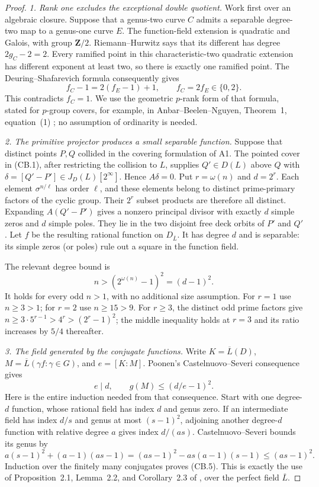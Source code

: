 \begin{proof}
\emph{1. Rank one excludes the exceptional double quotient.}
Work first over an algebraic closure. Suppose that a genus-two curve
$C$ admits a separable degree-two map to a genus-one curve $E$.
The function-field extension is quadratic and Galois, with group
$\mathbf Z/2$. Riemann--Hurwitz says that its different has degree
$2g_C-2=2$. Every ramified point in this characteristic-two quadratic
extension has different exponent at least two, so there is exactly
one ramified point. The Deuring--Shafarevich formula consequently gives
\[
 f_C-1=2(f_E-1)+1,\qquad f_C=2f_E\in\{0,2\}.              \tag{CB.3}
\]
This contradicts $f_C=1$. We use the geometric $p$-rank form of that
formula, stated for $p$-group covers, for example, in
Anbar--Beelen--Nguyen, Theorem~1, equation~(1)
\cite{AnbarBeelenNguyenP}; no assumption of ordinarity is needed.

\emph{2. The primitive projector produces a small separable function.}
Suppose that distinct points $P,Q$ collided in the covering formulation
of A1. The pointed cover in (CB.1), after restricting the collision
to $L$, supplies $Q'\in D(L)$ above $Q$ with
$\delta=[Q'-P']\in J_D(L)[2^\infty]$. Hence $A\delta=0$.
Put $r=\omega(n)$ and $d=2^r$. Each element
$\sigma^{n/\ell}$ has order $\ell$, and these elements belong to
distinct prime-primary factors of the cyclic group. Their $2^r$
subset products are therefore all distinct. Expanding $A(Q'-P')$
gives a nonzero principal divisor with exactly $d$ simple zeros and
$d$ simple poles. They lie in the two disjoint free deck orbits of
$P'$ and $Q'$. Let $f$ be the resulting rational function on
$D_{\overline L}$. It has degree $d$ and is separable: its simple
zeros (or poles) rule out a square in the function field.

The relevant degree bound is
\[
                         n>(2^{\omega(n)}-1)^2=(d-1)^2.
                                                               \tag{CB.4}
\]
It holds for every odd $n>1$, with no additional size assumption.
For $r=1$ use $n\ge3>1$; for $r=2$ use $n\ge15>9$.
For $r\ge3$, the distinct odd prime factors give
$n\ge3\cdot5^{r-1}>4^r>(2^r-1)^2$; the middle inequality holds
at $r=3$ and its ratio increases by $5/4$ thereafter.

\emph{3. The field generated by the conjugate functions.}
Write $K=\overline L(D)$,
$M=\overline L(\gamma f:\gamma\in G)$, and $e=[K:M]$.
Poonen's Castelnuovo--Severi consequence gives
\[
                  e\mid d,\qquad g(M)\le(d/e-1)^2.
                                                               \tag{CB.5}
\]
Here is the entire induction needed from that consequence. Start with
one degree-$d$ function, whose rational field has index $d$ and genus
zero. If an intermediate field has index $d/s$ and genus at most
$(s-1)^2$, adjoining another degree-$d$ function with relative degree
$a$ gives index $d/(as)$. Castelnuovo--Severi bounds its genus by
\[
 a(s-1)^2+(a-1)(as-1)
  =(as-1)^2-as(a-1)(s-1)\le(as-1)^2.
\]
Induction over the finitely many conjugates proves (CB.5).
This is exactly the use of Proposition~2.1, Lemma~2.2, and
Corollary~2.3 of \cite{Poonen2007Gonality}, over the perfect field
$\overline L$.


\end{proof}
